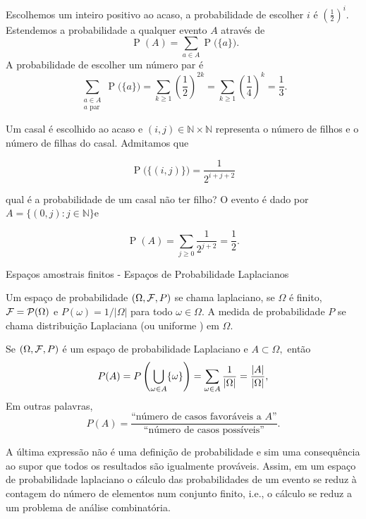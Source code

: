 \begin{frame}
\begin{exem}
Escolhemos um inteiro positivo ao acaso, a probabilidade de escolher ${i}$ é ${(\frac 12)^i}$. Estendemos a probabilidade a qualquer evento ${A}$ através de $$\displaystyle \mathop{\ P}(A) = \sum_{a\in A} \mathop{P}\big(\{a\}\big).$$ A probabilidade de escolher um número par é 
$$\displaystyle  \sum_{\substack{a\in A\\a\textrm{ par}}} \mathop{ P}\big(\{a\}\big) = \sum_{k\geq 1} \left( \frac 12 \right)^{2k} = \sum_{k\geq 1} \left( \frac 14 \right)^{k} = \frac 13.$$
\end{exem}
\begin{exem}
Um casal é escolhido ao acaso e ${(i,j)\in{\mathbb N}\times{\mathbb N}}$ representa o número de filhos e o número de filhas do casal. Admitamos que

$$\displaystyle  \mathop{ P}\big(\{(i,j)\}\big) = \frac 1{2^{i+j+2}}$$

qual é a probabilidade de um casal não ter filho? O evento é dado por $ {A=\big\{(0,j)\colon j\in{\mathbb N}\big\}} $e

$$\displaystyle \mathop{ P}(A) = \sum_{j\geq 0} \frac 1{2^{j+2}} = \frac 12.$$
\end{exem}
\end{frame}

\begin{frame}{Espaços amostrais finitos - Espaços de Probabilidade Laplacianos}
\begin{defi}
Um espaço de probabilidade $(\Omega, {\cal F}, P)$  se chama laplaciano, se
$\Omega$ é finito,  ${\cal F}=\mathcal{P}(\Omega )$ e $P(\omega)=1/|\Omega|$
para todo $\omega \in \Omega.$ A medida de probabilidade $P$ se chama
distribuição Laplaciana (ou uniforme ) em $\Omega.$
\end{defi}
\begin{nota}
Se $(\Omega, {\cal F}, P)$ é um espaço de probabilidade Laplaciano e $A \subset \Omega,$ então 
$$
P(A)= P\left(\bigcup_{\omega\in A} \{{\omega}\}\right) = \sum_{\omega\in A}\frac{1}{|\Omega|}=\frac{|A|}{|\Omega|}, 
$$
Em outras palavras, 
\begin{equation}
\label{flap}
P(A) = \frac{\text{``número de casos favoráveis a $A$''}}{\text{``número de
casos possíveis''}}.
\end{equation}
\end{nota}

A última expressão não é uma definição de probabilidade e sim uma consequência
ao supor que todos os resultados são igualmente prováveis. Assim, em um espaço de
probabilidade laplaciano o cálculo das probabilidades de um evento se reduz à
contagem do número de elementos num conjunto finito, i.e., o cálculo se reduz a
um problema de análise combinatória.
\end{frame}

